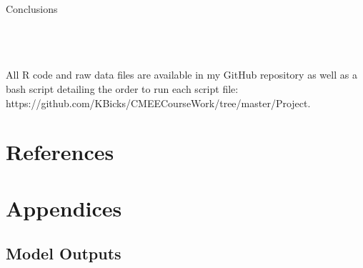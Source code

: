 \documentclass[11pt,a4paper]{article}
\begin{document}
	Conclusions
	
	
	\newpage
	
	\\
	
	\\
	\\
	All R code and raw data files are available in my GitHub repository as well as a bash script detailing the order to run each script file: https://github.com/KBicks/CMEECourseWork/tree/master/Project.  
	
	
	\newpage
	
	\section{References}
	
	\newpage
	
	
	\section{Appendices}
	
	\setcounter{table}{0}
	\renewcommand{\thetable}{A\arabic{table}}
	
	\subsection{Model Outputs}
	
\end{document}
